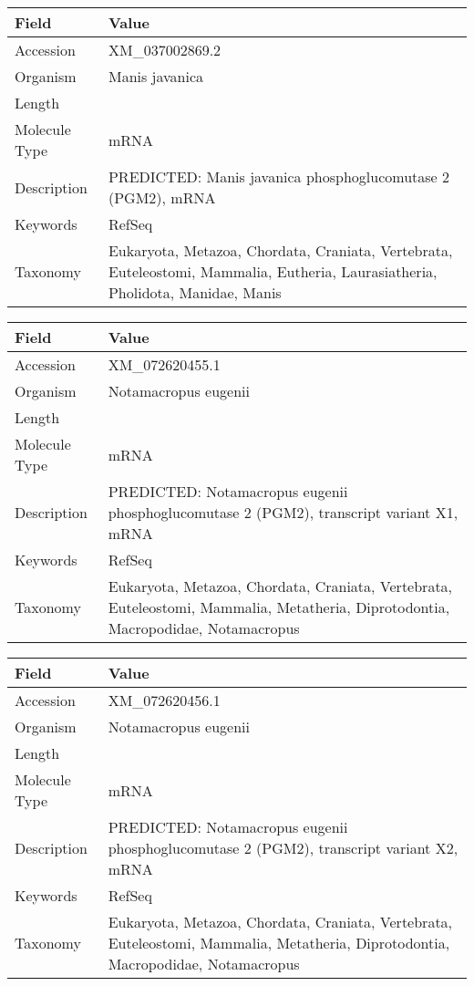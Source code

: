 \documentclass[10pt]{article}
\begin{document}
{\footnotesize
\begin{longtable}{>{\raggedright\arraybackslash}p{4.5cm} >{\raggedright\arraybackslash}p{11.5cm}}
\textbf{Field} & \textbf{Value} \\
\hline
Accession & XM\_037002869.2 \\
Organism & Manis javanica \\
Length & 2769 \\
Molecule Type & mRNA \\
Description & PREDICTED: Manis javanica phosphoglucomutase 2 (PGM2), mRNA \\
Keywords & RefSeq \\
Taxonomy & Eukaryota, Metazoa, Chordata, Craniata, Vertebrata, Euteleostomi, Mammalia, Eutheria, Laurasiatheria, Pholidota, Manidae, Manis \\
\end{longtable}
}

{\footnotesize
\begin{longtable}{>{\raggedright\arraybackslash}p{4.5cm} >{\raggedright\arraybackslash}p{11.5cm}}
\textbf{Field} & \textbf{Value} \\
\hline
Accession & XM\_072620455.1 \\
Organism & Notamacropus eugenii \\
Length & 2796 \\
Molecule Type & mRNA \\
Description & PREDICTED: Notamacropus eugenii phosphoglucomutase 2 (PGM2), transcript variant X1, mRNA \\
Keywords & RefSeq \\
Taxonomy & Eukaryota, Metazoa, Chordata, Craniata, Vertebrata, Euteleostomi, Mammalia, Metatheria, Diprotodontia, Macropodidae, Notamacropus \\
\end{longtable}
}

{\footnotesize
\begin{longtable}{>{\raggedright\arraybackslash}p{4.5cm} >{\raggedright\arraybackslash}p{11.5cm}}
\textbf{Field} & \textbf{Value} \\
\hline
Accession & XM\_072620456.1 \\
Organism & Notamacropus eugenii \\
Length & 2899 \\
Molecule Type & mRNA \\
Description & PREDICTED: Notamacropus eugenii phosphoglucomutase 2 (PGM2), transcript variant X2, mRNA \\
Keywords & RefSeq \\
Taxonomy & Eukaryota, Metazoa, Chordata, Craniata, Vertebrata, Euteleostomi, Mammalia, Metatheria, Diprotodontia, Macropodidae, Notamacropus \\
\end{longtable}
}
\end{document}
